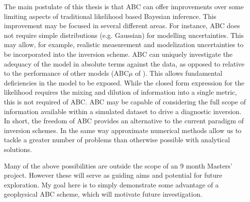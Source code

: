 The main postulate of this thesis is that ABC can offer improvements over some limiting aspects of traditional likelihood based Bayesian inference. This improvement may be focused in several different areas. For instance, ABC does not require simple distributions (e.g. Gaussian) for modelling uncertainties. This may allow, for example, realistic measurement and modelization uncertainties to be incorporated into the inversion scheme. ABC can uniquely investigate the adequacy of the model in absolute terms against the data, as opposed to relative to the performance of other models (ABC$\mu$ of \citet{Ratmann2009}). This allows fundamental deficiencies in the model to be exposed. While the closed form expression for the likelihood requires the mixing and dilution of information into a single metric, this is not required of ABC. ABC may be capable of considering the full scope of information available within a simulated dataset to drive a diagnostic inversion. In short, the freedom of ABC provides an alternative to the current paradigm of inversion schemes. In the same way approximate numerical methods allow us to tackle a greater number of problems than otherwise possible with analytical solutions. \par

Many of the above possibilities are outside the scope of an 9 month Masters' project. However these will serve as guiding aims and potential for future exploration. My goal here is to simply demonstrate some advantage of a geophysical ABC scheme, which will motivate future investigation.